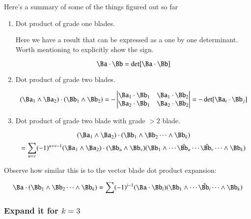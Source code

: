 Here's a summary of some of the things figured out so far

\begin{enumerate}
\item Dot product of grade one blades.

Here we have a result that can be expressed as a one by one determinant.  Worth mentioning to explicitly show the sign.

\begin{equation}\label{eqn:bladegradereduction:dotoneblades}
\Ba \cdot \Bb = \det[\Ba \cdot \Bb]
\end{equation}

\item Dot product of grade two blades.

\begin{equation}\label{eqn:bladegradereduction:k2k2dot}
(\Ba_1 \wedge \Ba_2) \cdot (\Bb_1 \wedge \Bb_2)
=
-
\begin{vmatrix}
\Ba_1 \cdot \Bb_1 & \Ba_1 \cdot \Bb_2 \\
\Ba_2 \cdot \Bb_1 & \Ba_2 \cdot \Bb_2 \\
\end{vmatrix}
=
-\det[\Ba_i \cdot \Bb_j]
\end{equation}

\item Dot product of grade two blade with grade $>2$ blade.

\begin{equation*}
(\Ba_{1} \wedge \Ba_2) \cdot (\Bb_1 \wedge \Bb_2 \cdots \wedge \Bb_k)
\end{equation*}
\begin{equation}\label{eqn:bladegradereduction:bivectordot}
= 
\sum_{u<v} (-1)^{u+v-1} 
(\Ba_1 \wedge \Ba_2) \cdot (\Bb_u \wedge \Bb_v)
(\Bb_1 \wedge \cdots \check{\Bb_u} \cdots \check{\Bb_v} \cdots \wedge \Bb_k) 
\end{equation}
\end{enumerate}

Observe how similar this is to the vector blade dot product expansion:

\begin{equation}\label{eqn:bladegradereduction:vectordot}
\Ba \cdot (\Bb_1 \wedge \Bb_2 \cdots \wedge \Bb_k)
= 
\sum (-1)^{i-1} 
(\Ba \cdot \Bb_i) (\Bb_1 \wedge \cdots \check{\Bb_i} \cdots \wedge \Bb_k) 
\end{equation}

\subsubsection{Expand it for $k=3$ }

